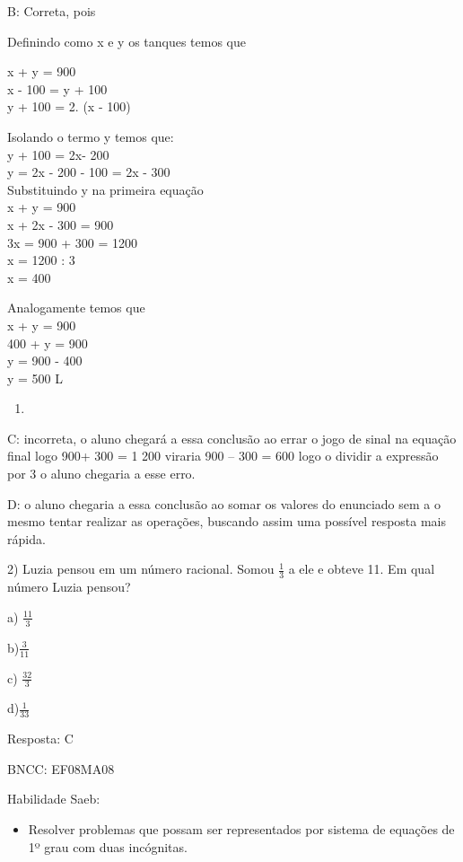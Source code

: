 {B: Correta, pois

Definindo como x e y os tanques temos que

x + y = 900\\
x - 100 = y + 100\\
y + 100 = 2. (x - 100)

Isolando o termo y temos que:\\
y + 100 = 2x- 200\\
y = 2x - 200 - 100 = 2x - 300\\
Substituindo y na primeira equação\\
x + y = 900\\
x + 2x - 300 = 900\\
3x = 900 + 300 = 1200\\
x = 1200 : 3\\
x = 400

Analogamente temos que\\
x + y = 900\\
400 + y = 900\\
y = 900 - 400\\
y = 500 L

\begin{enumerate}
\def\labelenumi{\Alph{enumi}.}
\setcounter{enumi}{1}
\tightlist
\item
\end{enumerate}

C: incorreta, o aluno chegará a essa conclusão ao errar o jogo de sinal
na equação final logo 900+ 300 = 1 200 viraria 900 -- 300 = 600 logo o
dividir a expressão por 3 o aluno chegaria a esse erro.

D: o aluno chegaria a essa conclusão ao somar os valores do enunciado
sem a o mesmo tentar realizar as operações, buscando assim uma possível
resposta mais rápida.

2) Luzia pensou em um número racional. Somou \(\frac{1}{3}\) a ele e
obteve 11. Em qual número Luzia pensou?

a) \(\frac{11}{3}\)

b)\(\frac{3}{11}\)

c) \(\frac{32}{3}\)

d)\(\frac{1}{33}\)

Resposta: C

BNCC: EF08MA08

Habilidade Saeb:

\begin{itemize}
\tightlist
\item
  Resolver problemas que possam ser representados por sistema de
  equações de 1º grau com duas incógnitas.
\end{itemize}

}
